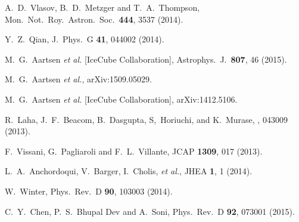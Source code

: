\documentclass[aps,prd,nofootinbib,twocolumn,floatfix,letterpaper,superscriptaddress,showpacs]{revtex4}
\begin{document}
\begin{thebibliography}{99}
  A.~D.~Vlasov, B.~D.~Metzger and T.~A.~Thompson,
  Mon.\ Not.\ Roy.\ Astron.\ Soc.\  {\bf 444}, 3537 (2014).

  Y.~Z.~Qian,
  J.\ Phys.\ G {\bf 41}, 044002 (2014).




  M.~G.~Aartsen {\it et al.} [IceCube Collaboration],
  Astrophys.\ J.\  {\bf 807}, 46 (2015).



  M.~G.~Aartsen {\it et al.},
  arXiv:1509.05029.


  M.~G.~Aartsen {\it et al.} [IceCube Collaboration],
  arXiv:1412.5106.





  R.\ Laha, J.~F.\ Beacom, B.\ Dasgupta, S,\ Horiuchi, and K.\ Murase,
  , 043009 (2013).

  F.~Vissani, G.~Pagliaroli and F.~L.~Villante,
  JCAP {\bf 1309}, 017 (2013).

  L.~A.\ Anchordoqui, V.\ Barger, I.\ Cholis, {\it et al.},
  JHEA  {\bf 1}, 1 (2014).

  W.~Winter,
  Phys.\ Rev.\ D {\bf 90}, 103003 (2014).

  C.~Y.~Chen, P.~S.~Bhupal Dev and A.~Soni,
  Phys.\ Rev.\ D {\bf 92}, 073001 (2015).


\end{thebibliography}
\end{document}
